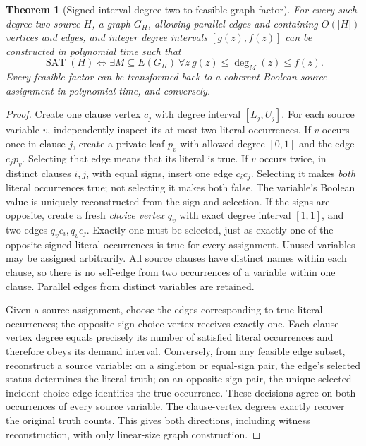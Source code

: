 \documentclass[11pt]{article}
\newtheorem{theorem}{Theorem}
\begin{document}
\begin{theorem}[Signed interval degree-two to feasible graph factor]
\label{thm:factor}
For every such degree-two source \(H\), a graph \(G_H\), allowing parallel
edges and containing \(O(|H|)\) vertices and edges, and integer degree
intervals \([g(z),f(z)]\) can be constructed in polynomial time such that
\[
 \boxed{\operatorname{SAT}(H)\iff
 \exists M\subseteq E(G_H)\ \forall z\
 g(z)\le\deg_M(z)\le f(z).}
\]
Every feasible factor can be transformed back to a coherent Boolean
source assignment in polynomial time, and conversely.
\end{theorem}
\begin{proof}
Create one clause vertex \(c_j\) with degree interval \([L_j,U_j]\).
For each source variable \(v\), independently inspect its at most two
literal occurrences.
If \(v\) occurs once in clause \(j\), create a private leaf \(p_v\)
with allowed degree \([0,1]\) and the edge \(c_jp_v\).
Selecting that edge means that its literal is true.
If \(v\) occurs twice, in distinct clauses \(i,j\), with equal signs,
insert one edge \(c_ic_j\). Selecting it makes \emph{both} literal
occurrences true; not selecting it makes both false. The variable's
Boolean value is uniquely reconstructed from the sign and selection.
If the signs are opposite, create a fresh \emph{choice vertex}
\(q_v\) with exact degree interval \([1,1]\), and two edges
\(q_vc_i,q_vc_j\). Exactly one must be selected, just as exactly one
of the opposite-signed literal occurrences is true for every assignment.
Unused variables may be assigned arbitrarily.
All source clauses have distinct names within each clause, so there is no
self-edge from two occurrences of a variable within one clause.
Parallel edges from distinct variables are retained.

Given a source assignment, choose the edges corresponding to true
literal occurrences; the opposite-sign choice vertex receives exactly one.
Each clause-vertex degree equals precisely its number of satisfied
literal occurrences and therefore obeys its demand interval.
Conversely, from any feasible edge subset, reconstruct a source variable:
on a singleton or equal-sign pair, the edge's selected status determines
the literal truth; on an opposite-sign pair, the unique selected incident
choice edge identifies the true occurrence. These decisions agree on both
occurrences of every source variable. The clause-vertex degrees exactly
recover the original truth counts. This gives both directions, including
witness reconstruction, with only linear-size graph construction.
\end{proof}
\end{document}
